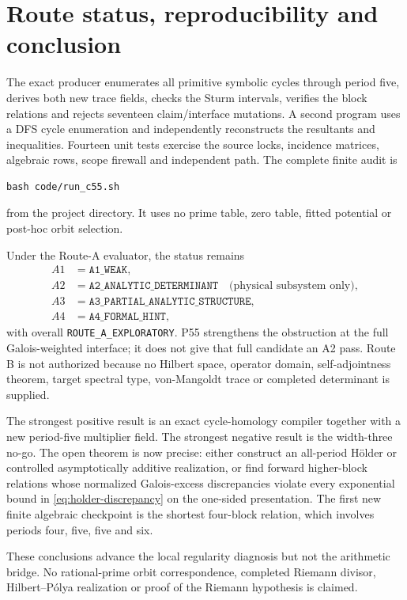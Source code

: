 \section{Route status, reproducibility and conclusion}

The exact producer enumerates all primitive symbolic cycles through period
five, derives both new trace fields, checks the Sturm intervals, verifies the
block relations and rejects seventeen claim/interface mutations.  A second
program uses a DFS cycle enumeration and independently reconstructs the
resultants and inequalities.  Fourteen unit tests exercise the source locks,
incidence matrices, algebraic rows, scope firewall and independent path.
The complete finite audit is
\begin{verbatim}
bash code/run_c55.sh
\end{verbatim}
from the project directory.  It uses no prime table, zero table, fitted
potential or post-hoc orbit selection.

Under the Route-A evaluator, the status remains
\[
 \begin{aligned}
 A1&=\texttt{A1\_WEAK},\\
 A2&=\texttt{A2\_ANALYTIC\_DETERMINANT}
       \quad\text{(physical subsystem only)},\\
 A3&=\texttt{A3\_PARTIAL\_ANALYTIC\_STRUCTURE},\\
 A4&=\texttt{A4\_FORMAL\_HINT},
 \end{aligned}
\]
with overall \texttt{ROUTE\_A\_EXPLORATORY}.  P55 strengthens the obstruction
at the full Galois-weighted interface; it does not give that full candidate
an A2 pass.  Route B is not authorized because no Hilbert space, operator
domain, self-adjointness theorem, target spectral type, von-Mangoldt trace or
completed determinant is supplied.

The strongest positive result is an exact cycle-homology compiler together
with a new period-five multiplier field.  The strongest negative result is
the width-three no-go.  The open theorem is now precise: either construct an
all-period H\"older or controlled asymptotically additive realization, or
find forward higher-block relations whose normalized Galois-excess
discrepancies violate every exponential bound in
\eqref{eq:holder-discrepancy} on the one-sided presentation.  The first
new finite algebraic checkpoint is the shortest four-block relation, which
involves periods four, five, five and six.

These conclusions advance the local regularity diagnosis but not the
arithmetic bridge.  No rational-prime orbit correspondence, completed
Riemann divisor, Hilbert--P\'olya realization or proof of the Riemann
hypothesis is claimed.

